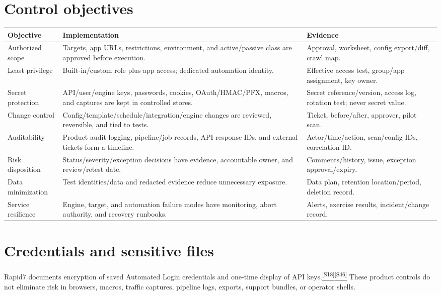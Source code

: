 \documentclass[11pt,letterpaper,oneside]{scrreprt}
\newcommand{\src}[1]{\hyperref[src:#1]{\textsuperscript{\color{R7Orange}[#1]}}}
\begin{document}
\section{Control objectives}
\begin{tabularx}{\textwidth}{@{}P{1.45in}Y P{2.10in}@{}}
\toprule
\textbf{Objective} & \textbf{Implementation} & \textbf{Evidence}\\
\midrule
Authorized scope & Targets, app URLs, restrictions, environment, and active/passive class are approved before execution. & Approval, worksheet, config export/diff, crawl map.\\
Least privilege & Built-in/custom role plus app access; dedicated automation identity. & Effective access test, group/app assignment, key owner.\\
Secret protection & API/user/engine keys, passwords, cookies, OAuth/HMAC/PFX, macros, and captures are kept in controlled stores. & Secret reference/version, access log, rotation test; never secret value.\\
Change control & Config/template/schedule/integration/engine changes are reviewed, reversible, and tied to tests. & Ticket, before/after, approver, pilot scan.\\
Auditability & Product audit logging, pipeline/job records, API response IDs, and external tickets form a timeline. & Actor/time/action, scan/config IDs, correlation ID.\\
Risk disposition & Status/severity/exception decisions have evidence, accountable owner, and review/retest date. & Comments/history, issue, exception approval/expiry.\\
Data minimization & Test identities/data and redacted evidence reduce unnecessary exposure. & Data plan, retention location/period, deletion record.\\
Service resilience & Engine, target, and automation failure modes have monitoring, abort authority, and recovery runbooks. & Alerts, exercise results, incident/change record.\\
\bottomrule
\end{tabularx}

\section{Credentials and sensitive files}
Rapid7 documents encryption of saved Automated Login credentials and one-time display of API keys.\src{S18}\src{S46} These product controls do not eliminate risk in browsers, macros, traffic captures, pipeline logs, exports, support bundles, or operator shells.
\end{document}
